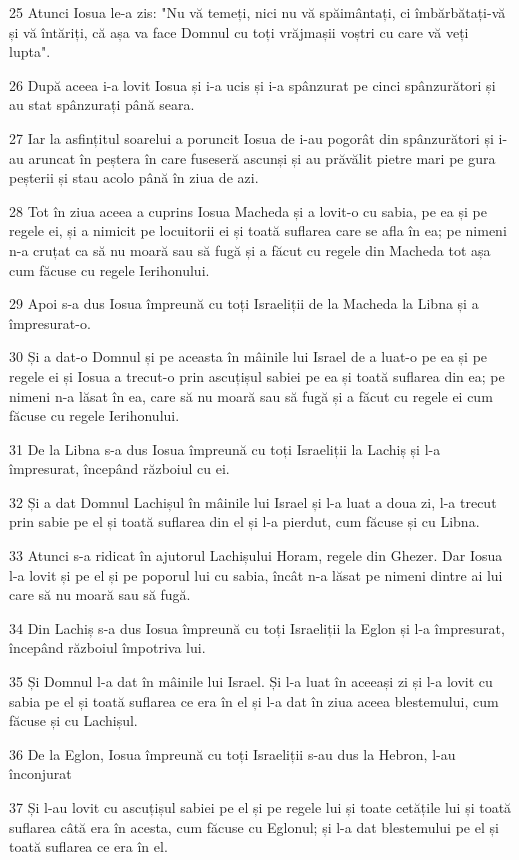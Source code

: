 \par 25 Atunci Iosua le-a zis: "Nu vă temeți, nici nu vă spăimântați, ci îmbărbătați-vă și vă întăriți, că așa va face Domnul cu toți vrăjmașii voștri cu care vă veți lupta".
\par 26 După aceea i-a lovit Iosua și i-a ucis și i-a spânzurat pe cinci spânzurători și au stat spânzurați până seara.
\par 27 Iar la asfințitul soarelui a poruncit Iosua de i-au pogorât din spânzurători și i-au aruncat în peștera în care fuseseră ascunși și au prăvălit pietre mari pe gura peșterii și stau acolo până în ziua de azi.
\par 28 Tot în ziua aceea a cuprins Iosua Macheda și a lovit-o cu sabia, pe ea și pe regele ei, și a nimicit pe locuitorii ei și toată suflarea care se afla în ea; pe nimeni n-a cruțat ca să nu moară sau să fugă și a făcut cu regele din Macheda tot așa cum făcuse cu regele Ierihonului.
\par 29 Apoi s-a dus Iosua împreună cu toți Israeliții de la Macheda la Libna și a împresurat-o.
\par 30 Și a dat-o Domnul și pe aceasta în mâinile lui Israel de a luat-o pe ea și pe regele ei și Iosua a trecut-o prin ascuțișul sabiei pe ea și toată suflarea din ea; pe nimeni n-a lăsat în ea, care să nu moară sau să fugă și a făcut cu regele ei cum făcuse cu regele Ierihonului.
\par 31 De la Libna s-a dus Iosua împreună cu toți Israeliții la Lachiș și l-a împresurat, începând războiul cu ei.
\par 32 Și a dat Domnul Lachișul în mâinile lui Israel și l-a luat a doua zi, l-a trecut prin sabie pe el și toată suflarea din el și l-a pierdut, cum făcuse și cu Libna.
\par 33 Atunci s-a ridicat în ajutorul Lachișului Horam, regele din Ghezer. Dar Iosua l-a lovit și pe el și pe poporul lui cu sabia, încât n-a lăsat pe nimeni dintre ai lui care să nu moară sau să fugă.
\par 34 Din Lachiș s-a dus Iosua împreună cu toți Israeliții la Eglon și l-a împresurat, începând războiul împotriva lui.
\par 35 Și Domnul l-a dat în mâinile lui Israel. Și l-a luat în aceeași zi și l-a lovit cu sabia pe el și toată suflarea ce era în el și l-a dat în ziua aceea blestemului, cum făcuse și cu Lachișul.
\par 36 De la Eglon, Iosua împreună cu toți Israeliții s-au dus la Hebron, l-au înconjurat
\par 37 Și l-au lovit cu ascuțișul sabiei pe el și pe regele lui și toate cetățile lui și toată suflarea câtă era în acesta, cum făcuse cu Eglonul; și l-a dat blestemului pe el și toată suflarea ce era în el.
